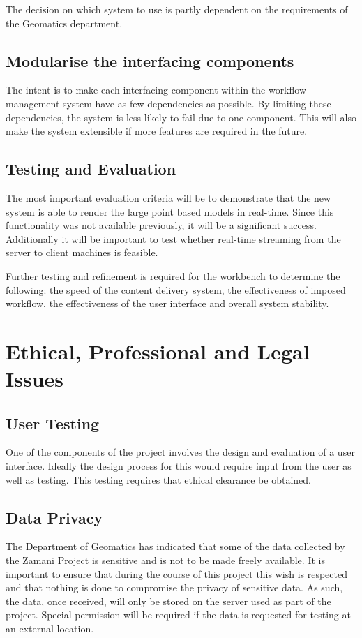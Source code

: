 \documentclass[12pt,a4paper]{article}
\begin{document}
The decision on which system to use is partly dependent on the requirements
of the Geomatics department.
\subsection{Modularise the interfacing components}
The intent is to make each interfacing component within the workflow management system
have as few dependencies as possible. By limiting these dependencies,
the system is less likely to fail due to one component. This will also make
the system extensible if more features are required in the future.

\subsection{Testing and Evaluation}
The most important evaluation criteria will be to demonstrate that the new
system is able to render the large point based models in real-time. Since this
functionality was not available previously, it will be a significant success.
Additionally it will be important to test whether real-time streaming from the
server to client machines is feasible.

Further testing and refinement is required for the workbench
to determine the  following: the speed of the content
delivery system, the effectiveness of imposed workflow, the
effectiveness of the user interface and overall system stability.

\section{Ethical, Professional and Legal Issues}
\subsection{User Testing}
One of the components of the project involves the design and evaluation
of a user interface. Ideally the design process for this would require
input from the user as well as testing. This testing requires that ethical clearance
be obtained.
\subsection{Data Privacy}
The Department of Geomatics has indicated that some of the data collected by
the Zamani Project is sensitive and is not to be made freely available. It is
important to ensure that during the course of this project this wish is respected
and that nothing is done to compromise the privacy of sensitive data. As such, the
data, once received, will only be stored on the server used as part of the project.
Special permission will be required if the data is requested for testing at an
external location.
\end{document}

